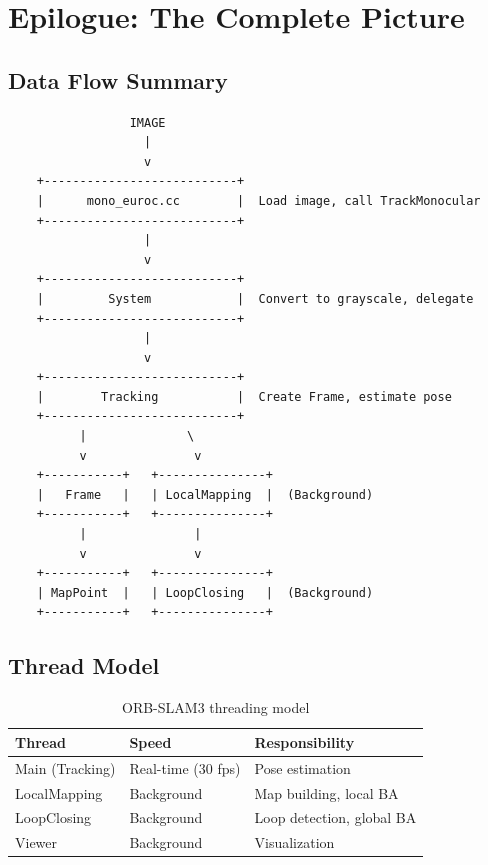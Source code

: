 \section{Epilogue: The Complete Picture}

\subsection{Data Flow Summary}

\begin{verbatim}
                 IMAGE
                   |
                   v
    +---------------------------+
    |      mono_euroc.cc        |  Load image, call TrackMonocular
    +---------------------------+
                   |
                   v
    +---------------------------+
    |         System            |  Convert to grayscale, delegate
    +---------------------------+
                   |
                   v
    +---------------------------+
    |        Tracking           |  Create Frame, estimate pose
    +---------------------------+
          |              \
          v               v
    +-----------+   +---------------+
    |   Frame   |   | LocalMapping  |  (Background)
    +-----------+   +---------------+
          |               |
          v               v
    +-----------+   +---------------+
    | MapPoint  |   | LoopClosing   |  (Background)
    +-----------+   +---------------+
\end{verbatim}

\subsection{Thread Model}

\begin{table}[H]
\centering
\begin{tabular}{@{}lll@{}}
\toprule
\textbf{Thread} & \textbf{Speed} & \textbf{Responsibility} \\
\midrule
Main (Tracking) & Real-time (30 fps) & Pose estimation \\
LocalMapping & Background & Map building, local BA \\
LoopClosing & Background & Loop detection, global BA \\
Viewer & Background & Visualization \\
\bottomrule
\end{tabular}
\caption{ORB-SLAM3 threading model}
\end{table}

